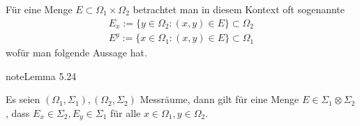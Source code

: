 \documentclass[letterpaper,10pt,german]{jupyterBook}
\begin{document}
\sphinxAtStartPar
Für eine Menge \(E\subset\Omega_1\times\Omega_2\) betrachtet man in diesem Kontext oft sogenannte 
\begin{equation*}
\begin{split}E_x := \{y\in \Omega_2: (x,y)\in E\}\subset\Omega_2\\
E^y := \{x\in \Omega_1: (x,y)\in E\}\subset\Omega_1\end{split}
\end{equation*}
\sphinxAtStartPar
wofür man folgende Aussage hat.
\label{masstheorie/integrationstechnik:lem:secmeasure}
\begin{sphinxadmonition}{note}{Lemma 5.24}



\sphinxAtStartPar
Es seien \((\Omega_1,\Sigma_1), (\Omega_2,\Sigma_2)\) Messräume, dann gilt für eine Menge \(E\in \Sigma_1\otimes\Sigma_2\), dass \(E_x\in \Sigma_2, E_y\in\Sigma_1\) für alle \(x\in\Omega_1,y\in\Omega_2\).
\end{sphinxadmonition}
\end{document}
